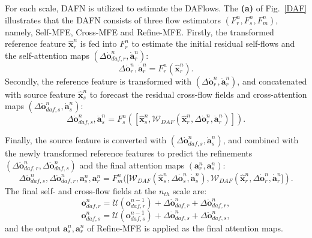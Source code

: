 \documentclass[runningheads]{llncs}
\begin{document}
 For each scale, DAFN is utilized to estimate the DAFlows. The \textbf{(a)} of Fig.~\ref{DAF} illustrates that the DAFN consists of three flow estimators $(F^n_r,  F^n_s, F^n_{m})$, namely, Self-MFE, Cross-MFE and Refine-MFE. 
Firstly, the transformed reference feature $\bm{\hat{x}}_r^n$ is fed into $F^n_r$ to estimate the initial residual self-flows and the self-attention maps $(\Delta\bm{\dot{o}}_{daf,r}^n,\bm{\dot{a}}_r^n)$:
\begin{equation}
\Delta\bm{\dot{o}}_r^n,\bm{\dot{a}}_r^n = F^n_r(\bm{\hat{x}}^n_r).
\end{equation}
Secondly, the reference feature is transformed with $(\Delta\bm{\dot{o}}_r^n,\bm{\dot{a}}_r^n)$, and concatenated with source feature $\bm{\hat{x}}_s^n$ to forecast the residual cross-flow fields and cross-attention maps $(\Delta\bm{\dot{o}}_{daf,s}^n,\bm{\dot{a}}_{s}^n)$: 
\begin{equation}
\Delta\bm{\dot{o}}_{daf,s}^n,\bm{\dot{a}}_{s}^n = F^n_s([\bm{\hat{x}}^n_s,\mathcal{W}_{DAF}(\bm{\hat{x}}^n_r,\Delta\bm{\dot{o}}_r^n,\bm{\dot{a}}_r^n)]).
\end{equation}

Finally, the source feature is converted with $(\Delta\bm{\dot{o}}_{daf,s}^n,\bm{\dot{a}}_{s}^n)$, and combined with the newly transformed reference features to predict the refinements $(\Delta\bm{\ddot{o}}_{daf,r}^n,\Delta\bm{\ddot{o}}_{daf,s}^n)$ and the final attention maps $(\bm{a}_r^n,\bm{a}_s^n)$:
\begin{equation}
\Delta\bm{\ddot{o}}_{daf,s}^n, \Delta\bm{\ddot{o}}_{daf,r}^n ,\bm{a}_s^n,\bm{a}_r^n= F^n_{m}([\mathcal{W}_{DAF}(\bm{\hat{x}}^n_s,\Delta\bm{\dot{o}}_s^n,\bm{\dot{a}}_s^n),\mathcal{W}_{DAF}(\bm{\hat{x}}^n_r,\Delta\bm{\dot{o}}_r^n,\bm{\dot{a}}_r^n]).
\end{equation}
The final self- and cross-flow fields at the $n_{th}$ scale are:
\begin{equation}
\bm{o}_{daf,r}^n = \mathcal{U}(\bm{o}_{daf,r}^{n-1}) + \Delta \bm{\dot{o}}_{daf,r}^n+ \Delta \bm{\ddot{o}}_{daf,r}^n,
\end{equation}
\begin{equation}
\bm{o}_{daf,s}^n = \mathcal{U}(\bm{o}_{daf,s}^{n-1}) + \Delta \bm{\dot{o}}_{daf,s}^n+ \Delta \bm{\ddot{o}}_{daf,s}^n,
\end{equation}
and the output $\bm{a}_s^n,\bm{a}_r^n$ of Refine-MFE is applied as the final attention maps.
\end{document}
